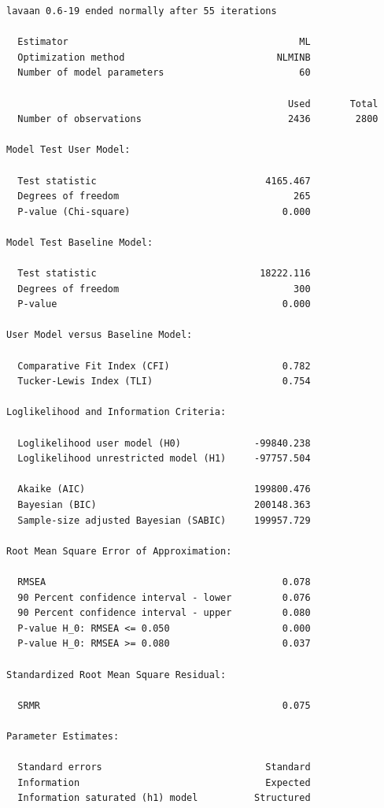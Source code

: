 \documentclass[
  a4paper,
]{ltjsbook}
\begin{document}
\begin{verbatim}
lavaan 0.6-19 ended normally after 55 iterations

  Estimator                                         ML
  Optimization method                           NLMINB
  Number of model parameters                        60

                                                  Used       Total
  Number of observations                          2436        2800

Model Test User Model:
                                                      
  Test statistic                              4165.467
  Degrees of freedom                               265
  P-value (Chi-square)                           0.000

Model Test Baseline Model:

  Test statistic                             18222.116
  Degrees of freedom                               300
  P-value                                        0.000

User Model versus Baseline Model:

  Comparative Fit Index (CFI)                    0.782
  Tucker-Lewis Index (TLI)                       0.754

Loglikelihood and Information Criteria:

  Loglikelihood user model (H0)             -99840.238
  Loglikelihood unrestricted model (H1)     -97757.504
                                                      
  Akaike (AIC)                              199800.476
  Bayesian (BIC)                            200148.363
  Sample-size adjusted Bayesian (SABIC)     199957.729

Root Mean Square Error of Approximation:

  RMSEA                                          0.078
  90 Percent confidence interval - lower         0.076
  90 Percent confidence interval - upper         0.080
  P-value H_0: RMSEA <= 0.050                    0.000
  P-value H_0: RMSEA >= 0.080                    0.037

Standardized Root Mean Square Residual:

  SRMR                                           0.075

Parameter Estimates:

  Standard errors                             Standard
  Information                                 Expected
  Information saturated (h1) model          Structured


\end{verbatim}
\end{document}
